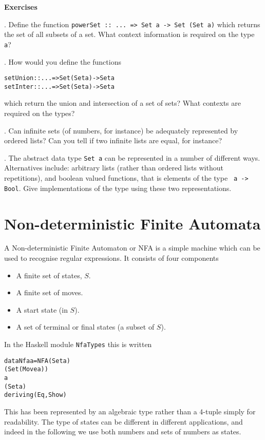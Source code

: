 \documentclass[11pt]{article}
\begin{document}
\medskip
\noindent
{\bf Exercises}

\medskip
{}. Define the
function {\tt powerSet :: ... => Set a -> Set (Set a)} which returns the set of all
subsets of a set. What context information is required on the type
\texttt{a}?

\medskip
{}. How would you define the
functions 

\begin{alltt}
setUnion :: ... => Set (Set a) -> Set a
setInter :: ... => Set (Set a) -> Set a
\end{alltt}
which return the union and intersection
of a set of sets? What contexts are required on the types? 

\medskip
{}. Can infinite sets (of numbers, for instance) be adequately
represented by ordered lists? Can you tell if two infinite lists are equal,
for instance?

\medskip
{}. The abstract data type {\tt Set a} can be represented in a number of different ways.
Alternatives include: arbitrary lists (rather than ordered lists without
repetitions), and boolean valued functions, that is elements of the type {\tt
a -> Bool}. Give implementations of the type using these two representations.

\section{Non-deterministic Finite Automata}

A Non-deterministic Finite Automaton or NFA
is a simple machine which can be used to
recognise regular expressions. It consists of four components
\begin{itemize}
\item A finite set of states, $S$.
\item A finite set of moves.
\item A start state (in $S$).
\item A set of terminal or final states (a subset of $S$).
\end{itemize}
In the Haskell module \texttt{NfaTypes} this is written
\begin{alltt}
data Nfa a = NFA (Set a) 
                 (Set (Move a)) 
                 a 
                 (Set a)
             deriving (Eq,Show)
\end{alltt}
This has been represented by an algebraic type rather than a 4-tuple simply
for readability. The type of states can be different in different
applications, and indeed in the following we use both numbers and sets of
numbers as states.
\end{document}
